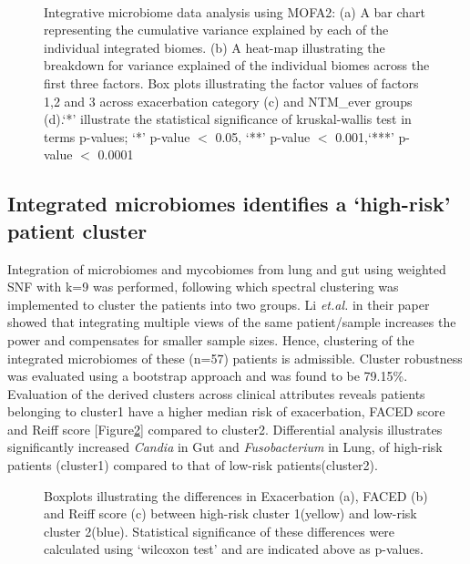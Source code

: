 \begin{figure}[h]
	\centering
	\\
	\caption{Integrative microbiome data analysis using MOFA2: (a) A bar chart representing the cumulative variance explained by each of the individual integrated biomes. (b) A heat-map illustrating the breakdown for variance explained of the individual biomes across the first three factors. Box plots illustrating the factor values of factors 1,2 and 3 across exacerbation category (c) and NTM\_ever groups (d).`*' illustrate the statistical significance of kruskal-wallis test in terms p-values; `*' p-value $<$ 0.05, `**' p-value $<$ 0.001,`***' p-value $<$ 0.0001}
	\label{res2_fig3}
\end{figure}

\subsection{Integrated microbiomes identifies a `high-risk' patient cluster}
Integration of microbiomes and mycobiomes from lung and gut using weighted SNF with k=9 was performed, following which spectral clustering was implemented to cluster the patients into two groups. Li \emph{et.al.} in their paper showed that integrating multiple views of the same patient/sample increases the power and compensates for smaller sample sizes\cite{Li2018}. Hence, clustering of the integrated microbiomes of these (n=57) patients is admissible. Cluster robustness was evaluated using a bootstrap approach and was found to be 79.15\%. Evaluation of the derived clusters across clinical attributes reveals patients belonging to cluster1 have a higher median risk of exacerbation, FACED score and Reiff score [Figure\ref{res2_fig4}] compared to cluster2. Differential analysis illustrates significantly increased \emph{Candia} in Gut and \emph{Fusobacterium} in Lung, of high-risk patients (cluster1) compared to that of low-risk patients(cluster2).

\begin{figure}[h]
	\centering
	\caption{Boxplots illustrating the differences in Exacerbation (a), FACED (b) and Reiff score (c) between high-risk cluster 1(yellow) and low-risk cluster 2(blue). Statistical significance of these differences were calculated using ‘wilcoxon test’ and are indicated above as p-values.}
	\label{res2_fig4}
\end{figure}

